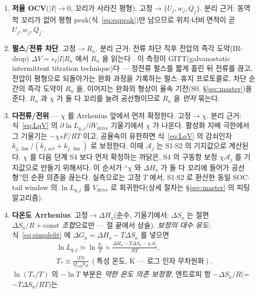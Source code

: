 \documentclass[11pt,a4paper]{article}
\newcommand{\drive}{\mathrm{drive}}
\newcommand{\cell}{\mathrm{cell}}
\begin{document}
\begin{enumerate}[label=\textbf{S\arabic*.},leftmargin=2.6em,itemsep=2pt]
\item \textbf{저율 OCV}($|I|\to0$, 꼬리가 사라진 평형). 고정$\to\{U_j,w_j,Q_j\}$. 분리 근거: 동역학 꼬리가
  없어 평형 peak(식~\eqref{eq:eqpeak})만 남으므로 위치$\cdot$너비$\cdot$면적이 곧 $U_j,w_j,Q_j$.
\item \textbf{펄스/전류 차단}. 고정$\to R_n$. 분리 근거: 전류 차단 직후 전압의 즉각 도약(IR-drop) $\Delta V=
  s_I|I|R_n$ 에서 $R_n$ 을 읽는다 \cite{weppner1977}. 이 측정이 GITT(galvanostatic intermittent titration
  technique)다 — 정전류 펄스를 짧게 흘린 뒤 전류를 끊고, 전압이 평형으로 되돌아가는 완화 과정을 기록하는
  펄스--휴지 프로토콜로, 차단 순간의 즉각 도약이 $R_n$ 을, 이어지는 완화의 형상이 율속 기전(S0, \S\ref{sec:master})을 준다. $R_n$ 과 $\chi$ 가 둘 다 꼬리를 늘려 공선형이므로
  $R_n$ 을 \emph{먼저} 묶는다.
\item \textbf{다전류/전위} — $\chi$ 를 Arrhenius 앞에서 먼저 확정한다. 고정$\to\chi$. 분리 근거:
  식~\eqref{eq:LqV} 의 $\partial\ln L_{q,j}/\partial V_\drive$ 기울기에서 $\chi$ 가 나온다. 활성화 지배
  극한에서 그 기울기는 $-\chi sF/RT$ 이고, 공율속이 유한하면 식~\eqref{eq:LqV} 의 감쇠인자
  $k_{j,\lim}/(k_{j,\mathrm{act}}+k_{j,\lim})$ 로 보정한다. 이때 $\mathcal A_j$ 는 S1$\cdot$S2 의 기지값으로
  계산된다. $\chi$ 를 다음 단계 S4 보다 먼저 확정하는 까닭은, S4 의 구동항 보정 $\chi\mathcal A_j$ 를 기지값으로
  만들기 위해서다. 이 순서가 ``$\chi$ 와 $\Delta H_a$ 가 둘 다 꼬리에 들어가 공선형''인 순환 의존을 끊는다.
  실측으로는 고정 $T$ 에서, S1$\cdot$S2 로 환산한 동일 SOC$\cdot$tail window 의 $\ln L_{q,j}$ 를 $V_\drive$ 로
  회귀한다(상세 절차는 \S\ref{sec:master} 의 피팅 알고리즘).
\item \textbf{다온도 Arrhenius}. 고정$\to\Delta H_a$(순수, 기울기에서; $\Delta S_a$ 는 절편 $\Delta S_a/R+\text{const}$
  \emph{조합}으로만 — 절 끝에서 상술). \emph{보정의 대수 유도}: 식~\eqref{eq:simplefit}
  에 $\Delta G_a=\Delta H_a-T\Delta S_a$ 를 넣으면
  \begin{equation*}
  \begin{gathered}
  \ln L_{q,j}\simeq\ln\frac{T_*}{T}+\frac{\Delta H_a-T\Delta S_a-\chi\mathcal A_j}{RT},\\[2pt]
  T_*\equiv\frac{|I|h}{Q_\cell k_B}\ (\text{특성 온도, K — 로그 인자 무차원화}).
  \end{gathered}
  \end{equation*}
  $\ln(T_*/T)$ 의 $-\ln T$ 부분은 \emph{약한 온도 의존 보정항}, 엔트로피 항 $-\Delta S_a/R$(=$-T\Delta S_a/RT$)는

\end{enumerate}
\end{document}
